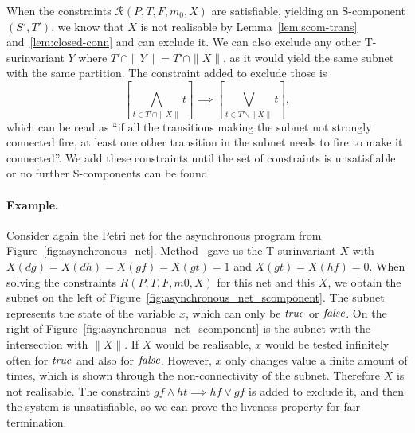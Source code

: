 When the constraints $\mathcal{R}(P, T, F, m_0, X)$ are satisfiable,
yielding an S-component $(S',T')$, we know that
$X$ is not realisable by Lemma~\ref{lem:scom-trans} and~\ref{lem:closed-conn} and can exclude it.
We can also exclude any other T-surinvariant $Y$ where
$T' \cap \|Y\| = T' \cap \|X\|$, as it would yield the same subnet with
the same partition. The constraint added to exclude those is
\begin{equation}
\left[ \bigwedge_{t ∈ T' \cap \| X \|} t \right] \implies
\left[ \bigvee_{t ∈ T' \backslash \| X \|} t \right],
\end{equation}
which can be read as ``if all the transitions making the subnet not strongly connected fire,
at least one other transition in the subnet needs to fire to make it connected''.
We add these constraints until the set of constraints is unsatisfiable or
no further S-components can be found.

\paragraph{Example.}
Consider again the Petri net for the asynchronous program from
Figure~\ref{fig:asynchronous_net}. Method \liveness\ gave us the
T-surinvariant $X$ with
$X(dg) = X(dh) = X(gf) = X(gt) = 1$ and $X(gt) = X(hf) = 0$.
When solving the constraints $R(P , T , F , m 0 , X)$ for this net and this $X$,
we obtain the subnet on the left of Figure~\ref{fig:asynchronous_net_scomponent}.
The subnet represents the state of the variable $x$, which can only be $\operatorname{\mathit{true}}$ or
$\operatorname{\mathit{false}}$.
On the right of Figure~\ref{fig:asynchronous_net_scomponent}
is the subnet with the intersection with $\|X\|$. If $X$ would be realisable,
$x$ would be tested infinitely often for $\operatorname{\mathit{true}}$ and also for $\operatorname{\mathit{false}}$.
However, $x$ only changes value a finite amount of times, which is shown
through the non-connectivity of the subnet. Therefore $X$ is not realisable.
The constraint $gf \land ht \implies hf \lor gf$ is added to exclude it,
and then the system is unsatisfiable, so we can prove the liveness property
for fair termination.


